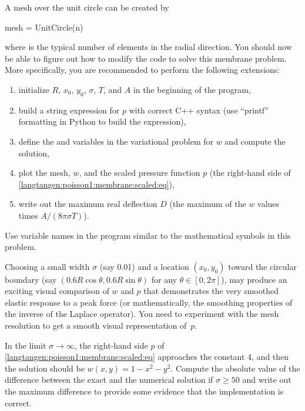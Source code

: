 A mesh over the unit circle can be created by
\begin{python}
mesh = UnitCircle(n)
\end{python}
where  is the typical number of elements in the radial
direction.  You should now be able to figure out how to modify the
 code to solve this membrane problem.  More
specifically, you are recommended to perform the following extensions:
\begin{enumerate}
  \item initialize $R$, $x_0$, $y_0$, $\sigma$, $T$, and $A$ in the
  beginning of the program,

  \item build a string expression for $p$ with correct C++ syntax (use
  ``printf'' formatting in Python to build the expression),

  \item define the  and  variables in the variational
  problem for $w$ and compute the solution,

  \item plot the mesh, $w$, and the scaled pressure function $p$ (the
  right-hand side of \eqref{langtangen:poisson1:membrane:scaled:eq}),

  \item write out the maximum real deflection $D$ (the maximum of the $w$
  values times $A/(8\pi\sigma T)$).
\end{enumerate}
Use variable names in the program similar to the mathematical symbols
in this problem.

Choosing a small width $\sigma$ (say 0.01) and a location $(x_0,y_0)$
toward the circular boundary (say $(0.6R\cos\theta, 0.6R\sin\theta)$
for any $\theta\in [0,2\pi]$), may produce an exciting visual comparison
of $w$ and $p$ that demonstrates the very smoothed elastic response to a
peak force (or mathematically, the smoothing properties of the inverse of
the Laplace operator).  You need to experiment with the mesh resolution
to get a smooth visual representation of~$p$.

In the limit $\sigma\rightarrow\infty$, the right-hand side $p$ of
\eqref{langtangen:poisson1:membrane:scaled:eq} approaches the constant
4, and then the solution should be $w(x,y) = 1-x^2-y^2$.  Compute the
absolute value of the difference between the exact and the numerical
solution if $\sigma \geqslant 50$ and write out the maximum difference
to provide some evidence that the implementation is correct.

